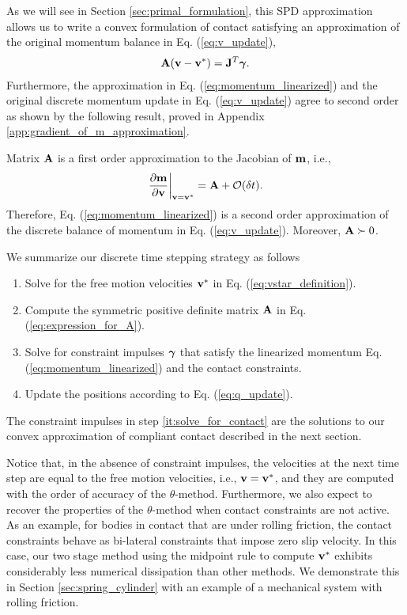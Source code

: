 As we will see in Section \ref{sec:primal_formulation}, this SPD approximation
allows us to write a convex formulation of contact satisfying an approximation
of the original momentum balance in Eq. (\ref{eq:v_update}),
\begin{align}
	\mf{A}(\mf{v}-\mf{v}^*) = \mf{J}^T\mf{\bgamma}.
	\label{eq:momentum_linearized}
\end{align}
Furthermore, the approximation in Eq. (\ref{eq:momentum_linearized}) and the
original discrete momentum update in Eq. (\ref{eq:v_update}) agree to second
order as shown by the following result, proved in Appendix
\ref{app:gradient_of_m_approximation}.
\begin{prop}	
Matrix ${\mathbf{A}}$ is a first order approximation to the Jacobian of ${\mathbf{m}}$,
i.e.,
\begin{align}
	\left. \frac{\partial {\mathbf{m}}}{\partial {\mathbf{v}}} \right|_{{\mathbf{v}}={\mathbf{v}}^*} = {\mathbf{A}} + \mathcal{O}(\delta t).
\end{align}
Therefore, Eq. (\ref{eq:momentum_linearized}) is a second order approximation of
the discrete balance of momentum in Eq. (\ref{eq:v_update}). Moreover, ${\mathbf{A}}
\succ 0$.
\label{prop:gradient_of_m_approximation}
\end{prop}

We summarize our discrete time stepping strategy as follows
\begin{enumerate}
	\item Solve for the free motion velocities ${\mathbf{v}}^*$ in Eq.
	(\ref{eq:vstar_definition}).
	\item Compute the symmetric positive definite matrix ${\mathbf{A}}$ in Eq.
	(\ref{eq:expression_for_A}).
	\item\label{it:solve_for_contact} Solve for constraint impulses ${\bm\gamma}$
	that satisfy the linearized momentum Eq. (\ref{eq:momentum_linearized}) and
	the contact constraints. 
	\item Update the positions according to Eq. (\ref{eq:q_update}).
\end{enumerate}

The constraint impulses in step \ref{it:solve_for_contact} are the solutions to
our convex approximation of compliant contact described in the next section.

Notice that, in the absence of constraint impulses, the velocities at the next
time step are equal to the free motion velocities, i.e., ${\mathbf{v}}={\mathbf{v}}^*$, and
they are computed with the order of accuracy of the $\theta\text{-method}$.
Furthermore, we also expect to recover the properties of the
$\theta\text{-method}$ when contact constraints are not active. As an example,
for bodies in contact that are under rolling friction,
the contact constraints behave as bi-lateral constraints that impose zero slip
velocity. In this case, our two stage method using the midpoint rule to compute
${\mathbf{v}}^*$ exhibits considerably less numerical dissipation than other methods.
We demonstrate this in Section \ref{sec:spring_cylinder} with an example of a
mechanical system with rolling friction.

